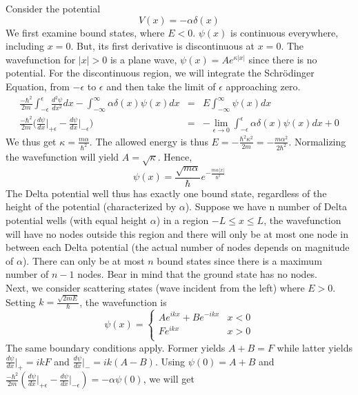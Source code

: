 \documentclass[a4paper]{article}
\begin{document}
\begin{eg}
Consider the potential
$$ V(x)=-\alpha\delta(x)$$
We first examine bound states, where $E<0$. $\psi(x)$ is continuous everywhere, including $x=0$. But, its first derivative is discontinuous at $x=0$. The wavefunction for $|x|>0$ is a plane wave, $\psi(x)=Ae^{\kappa|x|}$ since there is no potential. For the discontinuous region, we will integrate the Schr\"{o}dinger Equation, from $-\epsilon$ to $\epsilon$ and then take the limit of $\epsilon$ approaching zero.
\begin{eqnarray}
\frac{-\hbar^2}{2m}\int_{-\epsilon}^{\epsilon}\frac{d^2\psi}{dx^2}dx-\int_{-\infty}^{\infty}\alpha\delta(x)\psi(x)dx&=&E\int_{-\infty}^{\infty}\psi(x)dx\nonumber\\\frac{-\hbar^2}{2m}\bigg(\frac{d\psi}{dx}\bigg\vert_{+\epsilon}-\frac{d\psi}{dx}\bigg\vert_{-\epsilon}\bigg) &=&-\lim_{\epsilon\to0}\int_{-\epsilon}^{\epsilon}\alpha\delta(x)\psi(x)dx+0\nonumber
\end{eqnarray}
We thus get $\kappa=\frac{m\alpha}{\hbar^2}$. The allowed energy is thus $E=-\frac{\hbar^2\kappa^2}{2m}=-\frac{m\alpha^2}{2\hbar^2}$. Normalizing the wavefunction will yield $A=\sqrt{\kappa}$. Hence,
$$
\psi(x)=\frac{\sqrt{m\alpha}}{\hbar}e^{-\frac{m\alpha|x|}{\hbar^2}}
$$
The Delta potential well thus has exactly one bound state, regardless of the height of the potential (characterized by $\alpha$). Suppose we have n number of Delta potential wells (with equal height $\alpha$) in a region $-L\leq x\leq L$, the wavefunction will have no nodes outside this region and there will only be at most one node in between each Delta potential (the actual number of nodes depends on magnitude of $\alpha$). There can only be at most $n$ bound states since there is a maximum number of $n-1$ nodes. Bear in mind that the ground state has no nodes.\\[5pt]
Next, we consider scattering states (wave incident from the left) where $E>0$. Setting $k=\frac{\sqrt{2mE}}{\hbar}$, the wavefunction is
$$
\psi(x)=
\left\{
        \begin{array}{ll}
      Ae^{ikx}+Be^{-ikx} & x<0 \\
	Fe^{ikx}& x>0\\
        \end{array}
    \right.
$$
The same boundary conditions apply. Former yields $A+B=F$ while latter yields $\frac{d\psi}{dx}|_{+}=ikF$ and 
$\frac{d\psi}{dx}|_{-}=ik(A-B)$. 
Using $\psi(0)=A+B$ and $\frac{-\hbar^2}{2m}(\frac{d\psi}{dx}\vert_{+\epsilon}-\frac{d\psi}{dx}\vert_{-\epsilon})=-\alpha\psi(0)$, we will get

\end{eg}
\end{document}
